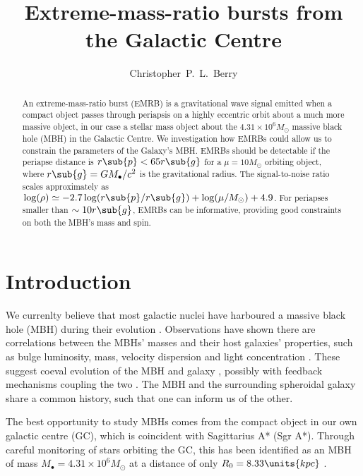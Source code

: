 \documentclass[11pt,twoside]{article}
\begin{document}
\resetcounters

\title{Extreme-mass-ratio bursts from the Galactic Centre}
 \author{Christopher~P.~L.~Berry }
 
\begin{abstract} 
An extreme-mass-ratio burst (EMRB) is a gravitational wave signal emitted when a compact object passes through periapsis on a highly eccentric orbit about a much more massive object, in our case a stellar mass object about the $4.31 \times 10^6 M_\odot$ massive black hole (MBH) in the Galactic Centre. We investigation how EMRBs could allow us to constrain the parameters of the Galaxy's MBH. EMRBs should be detectable if the periapse distance is $r\sub{p} < 65 r\sub{g}$ for a $\mu = 10 M_\odot$ orbiting object, where $r\sub{g} = GM_\bullet/c^2$ is the gravitational radius. The signal-to-noise ratio scales approximately as $\log(\rho) \simeq -2.7\log(r\sub{p}/r\sub{g}) + \log(\mu/M_\odot) + 4.9$. For periapses smaller than $\sim 10 r\sub{g}$, EMRBs can be informative, providing good constraints on both the MBH's mass and spin.
\end{abstract}

\section{Introduction} 

We currenlty believe that most galactic nuclei have harboured a massive black hole (MBH) during their evolution \citep{Lynden-Bell1971, Soltan1982, Rees1984}. Observations have shown there are correlations between the MBHs' masses and their host galaxies' properties, such as bulge luminosity, mass, velocity dispersion and light concentration \citep{Kormendy1995, Magorrian1998, Ferrarese2000, Gebhardt2000, Graham2001, Tremaine2002, Marconi2003, Haring2004, Graham2007, Graham2011}. These suggest coeval evolution of the MBH and galaxy \citep{Peng2007, Jahnke2011}, possibly with feedback mechanisms coupling the two \citep{Haiman2004, Volonteri2009}. The MBH and the surrounding spheroidal galaxy share a common history, such that one can inform us of the other.

The best opportunity to study MBHs comes from the compact object in our own galactic centre (GC), which is coincident with Sagittarius A* (Sgr A*). Through careful monitoring of stars orbiting the GC, this has been identified as an MBH of mass $M_\bullet = 4.31 \times 10^6 M_\odot$ at a distance of only $R_0 = 8.33\units{kpc}$ \citep{Gillessen2009}.
\end{document}
